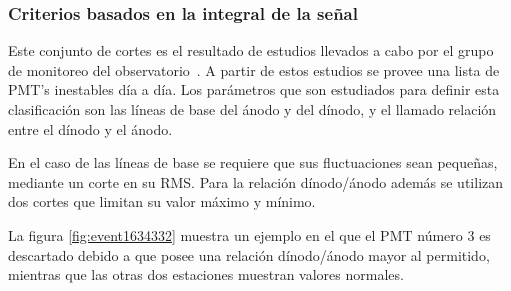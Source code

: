 		\subsubsection{Criterios basados en la integral de la señal}
		
		Este conjunto de cortes es el resultado de estudios llevados a cabo por el grupo de monitoreo del observatorio~\cite{pmtsAuger}. 
		A partir de estos estudios se provee una lista de PMT's inestables día a día.
		Los parámetros que son estudiados para definir esta clasificación son las líneas de base del ánodo y del dínodo, y el llamado relación entre el dínodo y el ánodo.
		
		En el caso de las líneas de base se requiere que sus fluctuaciones sean pequeñas, mediante un corte en su RMS. Para la relación dínodo/ánodo además se utilizan dos cortes que limitan su valor máximo y mínimo.
		
		La figura \ref{fig:event1634332} muestra un ejemplo en el que el PMT número 3 es descartado debido a que posee una relación dínodo/ánodo mayor al permitido, mientras que las otras dos estaciones muestran valores normales.
		
